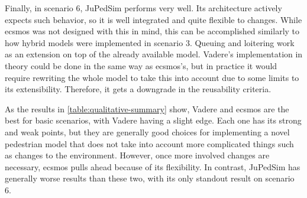 \documentclass[twoside, 11pt]{article}
\begin{document}
Finally, in scenario 6, JuPedSim performs very well. Its architecture actively expects such behavior, so it is well integrated and quite flexible to changes. While \gls{ecsmos} was not designed with this in mind, this can be accomplished similarly to how hybrid models were implemented in scenario 3. Queuing and loitering work as an extension on top of the already available model. Vadere's implementation in theory could be done in the same way as \gls{ecsmos}'s, but in practice it would require rewriting the whole model to take this into account due to some limits to its extensibility. Therefore, it gets a downgrade in the reusability criteria.

As the results in  \autoref{table:qualitative-summary} show, Vadere and \gls{ecsmos} are the best for basic scenarios, with Vadere having a slight edge. Each one has its strong and weak points, but they are generally good choices for implementing a novel pedestrian model that does not take into account more complicated things such as changes to the environment. However, once more involved changes are necessary, \gls{ecsmos} pulls ahead because of its flexibility. In contrast, JuPedSim has generally worse results than these two, with its only standout result on scenario 6.
\end{document}
